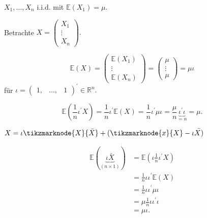 \documentclass{tstextbook}
\begin{document}
\begin{example}
	
$X_{1},\ldots,X_{n}$ i.i.d. mit $\mathbb{E}\left(X_{1}\right)=\mu.$

Betrachte $X=\begin{pmatrix}X_{1}\\
	\vdots\\
	X_{n}
\end{pmatrix}.$

\[
\mathbb{E}(X)=\begin{pmatrix}\mathbb{E}(X_{1})\\
	\vdots\\
	\mathbb{E}(X_{n})
\end{pmatrix}= \begin{pmatrix}
	\mu \\ \vdots \\ \mu
\end{pmatrix} = \mu\iota
\]
für $\iota=\begin{pmatrix}1, & \ldots, & 1\end{pmatrix}^{\prime}\in\mathbb{R}^{n}.$

\[
\mathbb{E}\left(\frac{1}{n}\iota^{\prime}X\right)=\frac{1}{n}\iota^{\prime}\mathbb{E}(X)=\frac{1}{n}\iota^{\prime}\mu\iota=\frac{\mu}{n}\underset{=n}{\underbrace{\iota^{\prime}\iota}}=\mu.
\]

\end{example}

\begin{remark}
$  
X =\iota\tikzmarknode{X}{\bar{X}}+(\tikzmarknode{x}{X}-\iota\bar{X)}$
\vspace{6ex}
\end{remark}

\begin{example}

\[
\begin{aligned}
\mathbb{E}(\underset{(n\times1)}{\underbrace{\iota\bar{X}}}) & =\mathbb{E}\left(\iota\frac{1}{n}\iota^{\prime}X\right)\\
 & =\frac{1}{n}\iota\iota^{\prime}\mathbb{E}(X)\\
 & =\frac{1}{n}\iota\iota^{\prime}\mu\iota\\
 & =\mu\frac{1}{n}\iota\iota^{\prime}\iota\\
 & =\mu\iota.
\end{aligned}
\]

\end{example}
\end{document}
